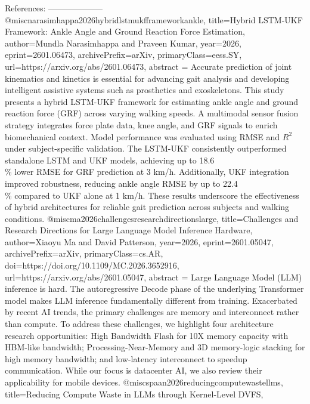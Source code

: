         References:
        --------------------
        @misc{narasimhappa2026hybridlstmukfframeworkankle,
      title={Hybrid LSTM-UKF Framework: Ankle Angle and Ground Reaction Force Estimation}, 
      author={Mundla Narasimhappa and Praveen Kumar},
      year={2026},
      eprint={2601.06473},
      archivePrefix={arXiv},
      primaryClass={eess.SY},
      url={https://arxiv.org/abs/2601.06473},
      abstract = {Accurate prediction of joint kinematics and kinetics is essential for advancing gait analysis and developing intelligent assistive systems such as prosthetics and exoskeletons. This study presents a hybrid LSTM-UKF framework for estimating ankle angle and ground reaction force (GRF) across varying walking speeds. A multimodal sensor fusion strategy integrates force plate data, knee angle, and GRF signals to enrich biomechanical context. Model performance was evaluated using RMSE and $R^2$ under subject-specific validation. The LSTM-UKF consistently outperformed standalone LSTM and UKF models, achieving up to 18.6\\\% lower RMSE for GRF prediction at 3 km/h. Additionally, UKF integration improved robustness, reducing ankle angle RMSE by up to 22.4\\\% compared to UKF alone at 1 km/h. These results underscore the effectiveness of hybrid architectures for reliable gait prediction across subjects and walking conditions.}
}@misc{ma2026challengesresearchdirectionslarge,
      title={Challenges and Research Directions for Large Language Model Inference Hardware}, 
      author={Xiaoyu Ma and David Patterson},
      year={2026},
      eprint={2601.05047},
      archivePrefix={arXiv},
      primaryClass={cs.AR},
      doi={https://doi.org/10.1109/MC.2026.3652916},
      url={https://arxiv.org/abs/2601.05047},
      abstract = {Large Language Model (LLM) inference is hard. The autoregressive Decode phase of the underlying Transformer model makes LLM inference fundamentally different from training. Exacerbated by recent AI trends, the primary challenges are memory and interconnect rather than compute. To address these challenges, we highlight four architecture research opportunities: High Bandwidth Flash for 10X memory capacity with HBM-like bandwidth; Processing-Near-Memory and 3D memory-logic stacking for high memory bandwidth; and low-latency interconnect to speedup communication. While our focus is datacenter AI, we also review their applicability for mobile devices.}
}@misc{spaan2026reducingcomputewastellms,
      title={Reducing Compute Waste in LLMs through Kernel-Level DVFS}, 
}
